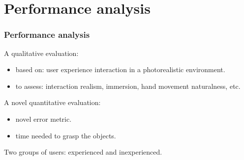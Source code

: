 \documentclass{beamer}
\theoremstyle{remark}
\theoremstyle{plain}
\begin{document}
\section{Performance analysis}

\begin{frame}
\frametitle{Performance analysis}

A qualitative evaluation:
\begin{itemize}
	\item based on: user experience interaction in a photorealistic environment.
	\item to assess: interaction realism, immersion, hand movement naturalness, etc.
\end{itemize}
A novel quantitative evaluation:
\begin{itemize}
	\item novel error metric.
	\item time needed to grasp the objects.
\end{itemize}

Two groups of users: experienced and inexperienced.


\end{frame}
\end{document}
